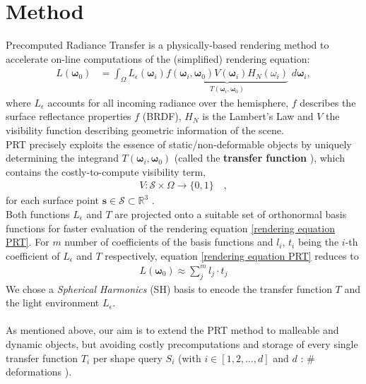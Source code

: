 \section{Method}
Precomputed Radiance Transfer  is a physically-based rendering method to accelerate on-line computations of the (simplified) rendering equation:
\begin{align}
L(\bm{\omega}_0 ) &= 
\int_{\Omega}   L_{\epsilon}(\bm{\omega}_i ) 
\underbrace{f(\bm{\omega}_i,\bm{\omega}_0) 
V(\bm{\omega}_i) H_N(\omega_i) }_{T(\bm{\omega}_i,\bm{\omega}_0) }
\,  \, d\bm{\omega}_i , 
\label{rendering equation PRT}
\end{align}
where $L_{\epsilon}$ accounts for all incoming radiance over the hemisphere, $f$  describes the surface reflectance properties $f$ (BRDF), $H_N$ is the Lambert's Law and $V$ the visibility function describing geometric information of the scene.\\
PRT precisely exploits the essence of static/non-deformable objects by uniquely determining the integrand $T(\bm{\omega}_i,\bm{\omega}_0)$ (called the \textbf{transfer function} ), which contains the costly-to-compute  visibility term,
\begin{align*}
V :  \mathcal{S}  \times \Omega \rightarrow \{0,1\} \quad,
\end{align*}
for each surface point $\bm{s} \in \mathcal{S} \subset \mathbb{R}^3$ \cite{CohenBook}. 
\\
Both functions $L_{\epsilon} $ and $T$  are projected onto a suitable set of orthonormal basis functions for faster evaluation of the rendering equation \ref{rendering equation PRT}. 
For $m$ number of coefficients of the basis functions and $l_i$, $t_i$ being the $i$-th coefficient of $L_{\epsilon} $ and $T$ respectively, equation \ref{rendering equation PRT} reduces to \cite{sloan2002precomputed} 
\begin{align}
L(\bm{\omega}_0 ) \approx \sum_{j}^{m} l_j \cdot t_j 
\label{Eq: Reduced Rendering Eq}
\end{align}
We chose a \textit{Spherical Harmonics} (SH) basis to encode the transfer function $T$ and the light environment $L_{\epsilon}$.
\\
\\
As mentioned above, our aim is to extend the PRT method to malleable and dynamic objects, but avoiding costly precomputations and storage of every single transfer function $T_i$ per shape query $S_i$ (with $i \in [1,2,\dots, d]$ and $d$ : $\#$ deformations ). \\

